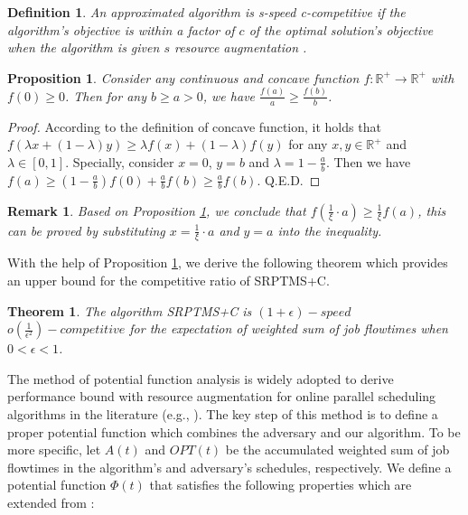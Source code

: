 \documentclass[10pt,conference,compsocconf,letterpaper]{IEEEtran}
\newtheorem{Theorem}{Theorem}
\newtheorem{prop}{Proposition}
\newtheorem{definition}{Definition}
\newtheorem{remark}{Remark}
\begin{document}
\begin{definition}
An approximated algorithm is \textit{s-speed c-competitive} if the algorithm's objective is within a factor of $c$
of the optimal solution's objective when the algorithm is given $s$ resource augmentation \cite{speedis}.
\end{definition}


\begin{prop}
\label{convex_function}
Consider any continuous and concave function $f: \mathbb{R}^{+} \rightarrow \mathbb{R}^{+}$ with $f(0) \geq 0$. Then for any $b \geq a > 0$, we have
 $\frac{f(a)}{a} \geq \frac{f(b)}{b}$.
\end{prop}

\begin{proof}
According to the definition of concave function, it holds that $f(\lambda x + (1-\lambda)y) \geq \lambda f(x) + (1-\lambda)f(y)$ for any
$x,y \in \mathbb{R}^{+}$ and $\lambda \in [0,1]$. Specially, consider $x=0$, $y=b$ and $\lambda = 1 - \frac{a}{b}$. Then we have $f(a) \geq (1-\frac{a}{b})f(0) +
\frac{a}{b}f(b) \geq \frac{a}{b}f(b)$. Q.E.D.
\end{proof}



\begin{remark}
\label{extention}
Based on Proposition \ref{convex_function}, we conclude that $f(\frac{1}{\xi}\cdot a) \geq \frac{1}{\xi} f(a)$, this can be proved by substituting $x = \frac{1}{\xi}\cdot a$ and
$y = a$ into the inequality.
\end{remark}

With the help of Proposition \ref{convex_function}, we derive the following theorem which provides an upper bound
for the competitive ratio of SRPTMS+C.

\begin{Theorem}
\label{competitive_ratio}
The algorithm SRPTMS+C is $(1+\epsilon)-speed$ $o(\frac{1}{\epsilon^2})-competitive$ for the expectation of weighted sum of job flowtimes
when $0< \epsilon < 1$.
\end{Theorem}
The method of potential function analysis is widely adopted to derive performance bound with resource augmentation for
online parallel scheduling algorithms in the literature (e.g., \cite{competitive,energy_efficient,scalably-scheduling,SRPT_identical}).
The key step of this method is to define a proper potential function which combines the adversary and our algorithm.
To be more specific, let $A(t)$ and $OPT(t)$ be the accumulated weighted sum of job flowtimes in the algorithm's and adversary's
schedules, respectively. We define a potential function $\Phi(t)$ that satisfies the following properties which are extended from \cite{competitive}:
\end{document}
